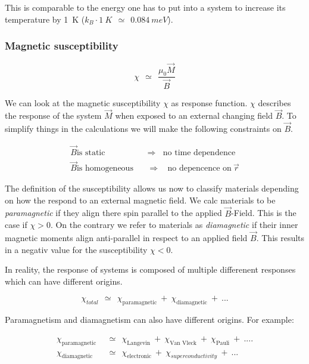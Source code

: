 \documentclass[10pt]{report}
\numberwithin{equation}{chapter}
\begin{document}
This is comparable to the energy one has to put into a system to increase its temperature by \SI[mode=text]{1}{K} ($ k_B \cdot \SI{1}{K} ~~\simeq~~ \SI{0.084}{meV}$).


\subsubsection{Magnetic susceptibility}

\begin{equation}
  \chi ~~≃~~ \frac{\mu_0 \vec{M}}{\vec{B}}
\end{equation}

We can look at the magnetic susceptibility $\chi$ as response function. $\chi$ describes the response of the system $\vec{M}$ when exposed to an external changing field $\vec{B}$.
To simplify things in the calculations we will make the following constraints on $\vec{B}$.

\begin{align*}
  \vec{B} \text{is static} ~~~~ &  \Rightarrow  ~~~~ \text{no time dependence}\\
  \vec{B} \text{is homogeneous} ~~~~ & \Rightarrow  ~~~~ \text{no depencence on}\ \vec{r}
\end{align*}


The definition of the susceptibility allows us now to classify materials depending on how the respond to an external magnetic field. We calc materials to be \textit{paramagnetic} if they align there spin parallel to the applied $\vec{B}$-Field. This is the case if $\chi > 0$. On the contrary we refer to materials as \textit{diamagnetic} if their inner magnetic moments align anti-parallel in respect to an applied field $\vec{B}$. This results in a negativ value for the susceptibility $\chi < 0$.

In reality, the response of systems is composed of multiple differenent responses which can have different origins.

\begin{equation}
  \chi_{total} ~~≃~~ \chi_\text{paramagnetic} ~+~ \chi_\text{diamagnetic} ~+~ ...
\end{equation}

Paramagnetism and diamagnetism can also have different origins. For example:

\begin{align*}
  \chi_\text{paramagnetic} ~~& ≃~~ \chi_\text{Langevin} ~+~ \chi_\text{Van Vleck} ~+~ \chi_\text{Pauli} ~+~ ....\\
  \chi_\text{diamagnetic} ~~& ≃~~ \chi_\text{electronic} ~+~ \chi_{superconductivity} ~+~ ...  
\end{align*}
\end{document}
